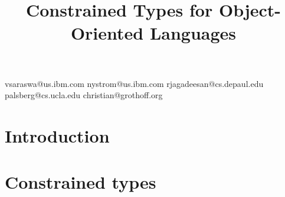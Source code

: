 \documentclass[10pt]{sigplanconf}
\newif\iflncs
\newif\iflstworks
\begin{document}
\iflncs
\title{Constrained Types for Object-Oriented Languages}
\titlerunning{Constrained Types}

\author{Vijay Saraswat\inst{1} \and Nathaniel Nystrom\inst{1}
\and Jens Palsberg\inst{2} \and Christian Grothoff\inst{3}}
\authorrunning{Vijay Saraswat et al.}

\institute{IBM T.~J. Watson Research~Center, P.O.~Box~704, Yorktown~Heights NY 10598 USA,
\email{\{vsaraswa,nystrom\}@us.ibm.com}
\and
UCLA~Computer~Science~Department,
Boelter~Hall, Los~Angeles CA 90095 USA,
\email{palsberg@cs.ucla.edu}
\and
Department~of~Computer~Science, University~of~Denver,
2360~S.~Gaylord~Street, John~Green~Hall, Room~214, Denver~CO, 80208 USA,
\email{christian@grothoff.org}}

\else

\title{Constrained Types for Object-Oriented Languages}
  {vsaraswa@us.ibm.com}
  {nystrom@us.ibm.com}
  {rjagadeesan@cs.depaul.edu}
  {palsberg@cs.ucla.edu}
  {christian@grothoff.org}


\fi

\maketitle

\begin{abstract}

\end{abstract}

\iflstworks
\section{Introduction}\label{sec:intro}


\section{Constrained types}\label{sec:lang}
\end{document}
